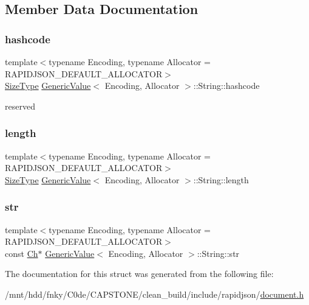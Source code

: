 \subsection{Member Data Documentation}
\mbox{\label{structGenericValue_1_1String_a73631052aeb72fbabb6eaab0175f858e}} 
\subsubsection{\texorpdfstring{hashcode}{hashcode}}
{\footnotesize\ttfamily template$<$typename Encoding, typename Allocator = R\+A\+P\+I\+D\+J\+S\+O\+N\+\_\+\+D\+E\+F\+A\+U\+L\+T\+\_\+\+A\+L\+L\+O\+C\+A\+T\+OR$>$ \\
\hyperlink{rapidjson_8h_a5ed6e6e67250fadbd041127e6386dcb5}{Size\+Type} \hyperlink{classGenericValue}{Generic\+Value}$<$ Encoding, Allocator $>$\+::String\+::hashcode}



reserved 

\mbox{\label{structGenericValue_1_1String_ad6ffab0e093aa8db6e415812ff6443bf}} 
\subsubsection{\texorpdfstring{length}{length}}
{\footnotesize\ttfamily template$<$typename Encoding, typename Allocator = R\+A\+P\+I\+D\+J\+S\+O\+N\+\_\+\+D\+E\+F\+A\+U\+L\+T\+\_\+\+A\+L\+L\+O\+C\+A\+T\+OR$>$ \\
\hyperlink{rapidjson_8h_a5ed6e6e67250fadbd041127e6386dcb5}{Size\+Type} \hyperlink{classGenericValue}{Generic\+Value}$<$ Encoding, Allocator $>$\+::String\+::length}

\mbox{\label{structGenericValue_1_1String_a4eebc5acf3f93ab833efd82abf3ba84d}} 
\subsubsection{\texorpdfstring{str}{str}}
{\footnotesize\ttfamily template$<$typename Encoding, typename Allocator = R\+A\+P\+I\+D\+J\+S\+O\+N\+\_\+\+D\+E\+F\+A\+U\+L\+T\+\_\+\+A\+L\+L\+O\+C\+A\+T\+OR$>$ \\
const \hyperlink{classGenericValue_ade0e0ce64ccd5d852da57a35e720bafb}{Ch}$\ast$ \hyperlink{classGenericValue}{Generic\+Value}$<$ Encoding, Allocator $>$\+::String\+::str}



The documentation for this struct was generated from the following file\+:\begin{DoxyCompactItemize}
\item 
/mnt/hdd/fnky/\+C0de/\+C\+A\+P\+S\+T\+O\+N\+E/clean\+\_\+build/include/rapidjson/\hyperlink{document_8h}{document.\+h}\end{DoxyCompactItemize}
